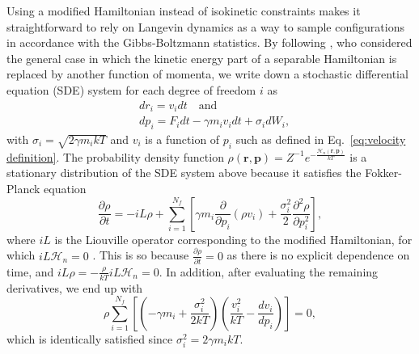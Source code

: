 \documentclass[
aip,
jcp,
reprint,
]{revtex4-1}
\newcommand{\vt}[1]{\boldsymbol{\mathbf{#1}}}          %
\newcommand{\diff}[2]{\frac{\partial #2}{\partial #1}} %
\begin{document}
Using a modified Hamiltonian instead of isokinetic constraints makes it straightforward to rely on Langevin dynamics as a way to sample configurations in accordance with the Gibbs-Boltzmann statistics.
By following \citeauthor{Stoltz_2018} \cite{Stoltz_2018}, who considered the general case in which the kinetic energy part of a separable Hamiltonian is replaced by another function of momenta, we write down a stochastic differential equation (SDE) system for each degree of freedom $i$ as
\begin{subequations}
	\label{eq:Langevin equations}
	\begin{align}
	&dr_i = v_i dt \quad \mathrm{and} \\
	&dp_i = F_i dt - \gamma m_i v_i dt + \sigma_i dW_i,
	\end{align}
\end{subequations}
with $\sigma_i = \sqrt{2 \gamma m_i kT}$ and $v_i$ is a function of $p_i$ such as defined in Eq.~\eqref{eq:velocity definition}.
The probability density function $\rho(\vt r, \vt p) = {Z}^{-1} e^{-\frac{\mathcal{H}_n(\vt r, \vt p)}{kT}}$ is a stationary distribution of the SDE system above because it satisfies the Fokker-Planck equation \cite{Leimkuhler_2015}
\begin{equation}
\diff{t}{\rho} = -i\!L \rho + \sum_{i=1}^{N_f} \left[ \gamma m_i \diff{p_i}{}(\rho v_i) + \frac{\sigma_i^2}{2} \diff{p_i^2}{^2 \rho} \right],
\end{equation}
where $i\!L$ is the Liouville operator corresponding to the modified Hamiltonian, for which $i\!L \mathcal{H}_n = 0$ \cite{Tuckerman_2010}.
This is so because $\diff{t}{\rho} = 0$ as there is no explicit dependence on time, and $i\!L \rho = -\frac{\rho}{kT}i\!L \mathcal{H}_n = 0$.
In addition, after evaluating the remaining derivatives, we end up with
\begin{equation}
\rho \sum_{i=1}^{N_f} \left[ \left(-\gamma m_i + \frac{\sigma_i^2}{2 kT}\right) \left(\frac{v_i^2}{kT} - \frac{d v_i}{d p_i}\right) \right] = 0,
\end{equation}
which is identically satisfied since $\sigma_i^2 = 2 \gamma m_i kT$.
\end{document}
